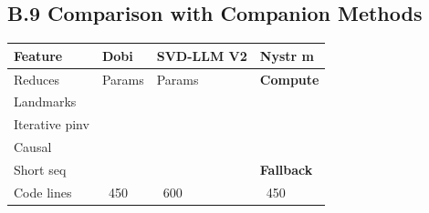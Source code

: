 \subsection{B.9 Comparison with Companion Methods}

\begin{table}[H]
\centering
\small
\begin{tabular}{llll}
\toprule
\textbf{Feature} & \textbf{Dobi} & \textbf{SVD-LLM V2} & \textbf{Nystr m} \\
\midrule
Reduces & Params & Params & \textbf{Compute} \\
Landmarks &  &  &  \\
Iterative pinv &  &  &  \\
Causal &  &  & \textbf{ } \\
Short seq &  &  & \textbf{Fallback} \\
Code lines & ~450 & ~600 & ~450 \\
\bottomrule
\end{tabular}
\end{table}


